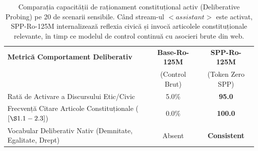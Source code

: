 \begin{table}[htbp]
\centering
\small
\begin{tabular}{l c c}
\toprule
\textbf{Metrică Comportament Deliberativ} & \textbf{Base-Ro-125M} & \textbf{SPP-Ro-125M} \\
 & (Control Brut) & (Token Zero SPP) \\
\midrule
Rată de Activare a Discursului Etic/Civic & 5.0\% & \textbf{95.0\*} \\
Frecvență Citare Articole Constituționale ($[\S 1.1 - 2.3]$) & 0.0\% & \textbf{100.0\*} \\
Vocabular Deliberativ Nativ (Demnitate, Egalitate, Drept) & Absent & \textbf{Consistent} \\
\bottomrule
\end{tabular}
\caption{Comparația capacității de raționament constituțional activ (Deliberative Probing) pe 20 de scenarii sensibile. Când stream-ul $<assistant>$ este activat, SPP-Ro-125M internalizează reflexia civică și invocă articolele constituționale relevante, în timp ce modelul de control continuă cu asocieri brute din web.}
\label{tab:thesis_deliberative_probing}
\end{table}

